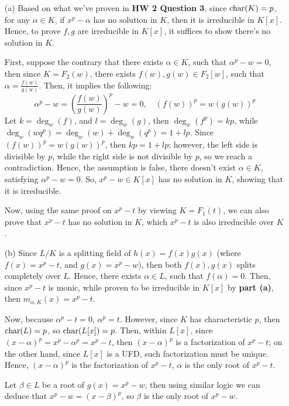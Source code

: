 \documentclass{article}
\begin{document}
\begin{itemize}
    \item[(a)] Based on what we've proven in \textbf{HW 2 Question 3}, since $\textmd{char}(K)=p$, for any $\alpha\in K$, if $x^p-\alpha$ has no solution in $K$, then it is irreducible in $K[x]$. Hence, to prove $f,g$ are irreducible in $K[x]$, it suffices to show there's no solution in $K$.
    
    First, suppose the contrary that there exists $\alpha\in K$, such that $\alpha^p-w = 0$, then since $K=F_2(w)$, there exists $f(w),g(w)\in F_2[w]$, such that $\alpha = \frac{f(w)}{g(w)}$. Then, it implies the following:
    $$\alpha^p-w = \left(\frac{f(w)}{g(w)}\right)^p-w = 0,\quad (f(w))^p = w(g(w))^p$$
    Let $k = \deg_w(f)$, and $l=\deg_w(g)$, then $\deg_w(f^p) = kp$, while $\deg_w(wq^p) = \deg_w(w)+\deg_w(q^p) = 1+lp$. Since $(f(w))^p=w(g(w))^p$, then $kp = 1+lp$; however, the left side is divisible by $p$, while the right side is not divisible by $p$, so we reach a contradiction.
    Hence, the assumption is false, there doesn't exist $\alpha\in K$, satisfying $\alpha^p-w=0$. So, $x^p-w\in K[x]$ has no solution in $K$, showing that it is irreducible.

    Now, using the same proof on $x^p-t$ by viewing $K=F_1(t)$, we can also prove that $x^p-t$ has no solution in $K$, which $x^p-t$ is also irreducible over $K$.

    \hfil
    
    \item[(b)] Since $L/K$ is a splitting field of $h(x)=f(x)g(x)$ (where $f(x)=x^p-t$, and $g(x)=x^p-w$), then both $f(x),g(x)$ splits completely over $L$. Hence, there exists $\alpha\in L$, such that $f(\alpha)=0$. Then, since $x^p-t$ is monic, while proven to be irreducible in $K[x]$ by \textbf{part (a)}, then $m_{\alpha,K}(x) = x^p-t$.
    
    Now, because $\alpha^p-t = 0$, $\alpha^p=t$. However, since $K$ has characteristic $p$, then $\textmd{char}(L)=p$, so $\textmd{char}(L[x]) = p$. Then, within $L[x]$, since $(x-\alpha)^p = x^p-\alpha^p = x^p-t$, then $(x-\alpha)^p$ is a factorization of $x^p-t$; on the other hand, since $L[x]$ is a UFD, such factorization must be unique. Hence, $(x-\alpha)^p$ is the factorization of $x^p-t$, $\alpha$ is the only root of $x^p-t$. 

    Let $\beta\in L$ be a root of $g(x) = x^p-w$, then using similar logic we can deduce that $x^p-w = (x-\beta)^p$, so $\beta$ is the only root of $x^p-w$.


\end{itemize}
\end{document}

